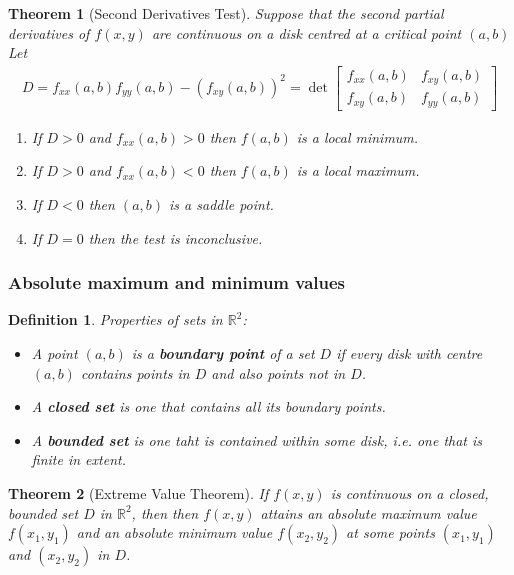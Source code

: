 \documentclass{article}
\theoremstyle{sltheorem}
\newtheorem{definition}{Definition}[section]
\newtheorem{theorem}{Theorem}[section]
\newcommand{\R}{\mathbb{R}}
\newcommand*\B[1]{\textbf{#1}}
\begin{document}
\begin{theorem}[Second Derivatives Test]
    Suppose that the second partial derivatives of $f(x,y)$ are continuous
    on a disk centred at a critical point $(a,b)$ Let
    \begin{align*}
        D = f_{xx}(a,b)f_{yy}(a,b) -\left(f_{xy}(a,b)\right)^2
        = \det\begin{bmatrix}
            f_{xx}(a,b) &f_{xy}(a,b)\\
            f_{xy}(a,b) &f_{yy}(a,b) 
        \end{bmatrix}
    \end{align*}
    \begin{enumerate}
        \item If $D>0$ and $f_{xx}(a,b)>0$ then $f(a,b)$ is a local minimum.
        \item If $D>0$ and $f_{xx}(a,b)<0$ then $f(a,b)$ is a local maximum.
        \item If $D<0$ then $(a,b)$ is a saddle point.
        \item If $D=0$ then the test is inconclusive.
    \end{enumerate}
\end{theorem}
\subsubsection{Absolute maximum and minimum values}
\begin{definition}
    Properties of sets in $\R^2$:
    \begin{itemize}
        \item A point $(a,b)$ is a \B{boundary point} of a set $D$ if
        every disk with centre $(a,b)$ contains points in $D$ and also points
        not in $D$.
        \item A \B{closed set} is one that contains all its boundary points.
        \item A \B{bounded set} is one taht is contained within some disk, i.e.
        one that is finite in extent.
    \end{itemize}
\end{definition}
\begin{theorem}[Extreme Value Theorem]
    If $f(x,y)$ is continuous on a closed, bounded set $D$ in $\R^2$, then
    then $f(x,y)$ attains an absolute maximum value $f(x_1, y_1)$ and an
    absolute minimum value $f(x_2, y_2)$ at some points $(x_1, y_1)$ and
    $(x_2, y_2)$ in $D$. 
\end{theorem}
\end{document}
